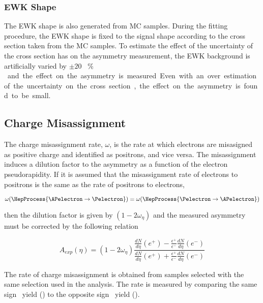 \subsubsection{\ac{EWK} \ETm Shape}

The \ac{EWK} shape is also generated from \ac{MC} samples. During the fitting
procedure, the \ac{EWK} shape is fixed to the \Wenu signal shape according to
the cross section taken from the \ac{MC} samples. To estimate the effect of the
uncertainty of the cross section has on the asymmetry measurement, the \ac{EWK}
background is artificially varied by \unit{$\pm20$}{ \% } and the effect on the
asymmetry is measured. Even with an over estimation of the uncertainty on the
cross section, the effect on the asymmetry is found to be small.

\subsection{Charge Misassignment}

The charge misassignment rate, $\omega$, is the rate at which electrons are
misasigned as positive charge and identified as positrons, and vice versa. The
misassignment induces a dilution factor to the asymmetry as a function of the
electron pseudorapidity. If it is assumed that the misassignment rate of
electrons to positrons is the same as the rate of positrons to electrons, \ie 

\begin{equation}
  \omega( \HepProcess{\APelectron \to \Pelectron} ) =
  \omega( \HepProcess{\Pelectron \to \APelectron} )
\end{equation}

then the dilution factor is given by $(1-2\omega_\eta)$ and the measured
asymmetry must be corrected by the following relation

\begin{equation}
  A_{exp}(\eta) = (1-2\omega_\eta)
                \frac{
                    \frac{dN}{d\eta}(e^+)-
                    \frac{\epsilon^+}{\epsilon^-}\frac{dN}{d\eta}(e^-)
                }
                {
                    \frac{dN}{d\eta}(e^+)+
                    \frac{\epsilon^+}{\epsilon^-}\frac{dN}{d\eta}(e^-)
                }
\end{equation}

The rate of charge misassignment is obtained from \Zee samples selected with
the same selection used in the analysis. The rate is measured by comparing the
same sign \PZ\ yield (\HepProcess{\PZ\to\Pepm\Pepm}) to the opposite sign \PZ\
yield (\HepProcess{\PZ\to\Pepm\Pemp}).

